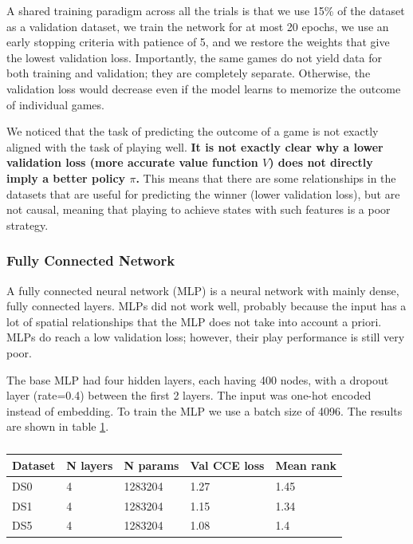 \documentclass{article}
\begin{document}
A shared training paradigm across all the trials is that
we use 15\% of the dataset as a validation dataset, we
train the network for at most 20 epochs, we use an early
stopping criteria with patience of 5, and we restore the
weights that give the lowest validation loss. Importantly,
the same games do not yield data for both training and
validation; they are completely separate. Otherwise, the
validation loss would decrease even if the model learns
to memorize the outcome of individual games.

We noticed that the task of predicting the outcome of a
game is not exactly aligned with the task of playing well.
\textbf{It is not exactly clear why a lower validation loss
(more accurate value function $V$) does not directly imply
a better policy $\pi$.} This means that there are some
relationships in the datasets that are useful for predicting
the winner (lower validation loss), but are not causal, meaning
that playing to achieve states with such features is a poor strategy.



\subsubsection{Fully Connected Network}
A fully connected neural network (MLP) is a neural network
with mainly dense, fully connected layers. MLPs did not
work well, probably because the input has a lot of spatial
relationships that the MLP does not take into account a priori.
MLPs do reach a low validation loss; however, their play
performance is still very poor.


The base MLP had four hidden layers, each having 400 nodes,
with a dropout layer (rate=0.4) between the first 2 layers.
The input was one-hot encoded instead of embedding. To train
the MLP we use a batch size of 4096. The results are shown
in table \ref{tbl:mlp_res}.
\begin{table}[]
\centering
\label{tbl:mlp_res}
\begin{tabular}{|l|l|l|l|l|}
\hline
Dataset & N layers & N params & Val CCE loss & Mean rank \\ \hline
DS0 & 4& 1283204& 1.27& 1.45 \\ \hline
DS1 & 4& 1283204& 1.15 & 1.34 \\ \hline
DS5 & 4& 1283204& 1.08 & 1.4 \\ \hline
\end{tabular}
\caption{}
\end{table}
\end{document}
